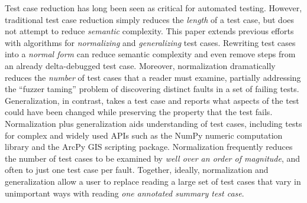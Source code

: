 Test case reduction has long been seen as critical for automated testing.  However, traditional test case reduction simply reduces the \emph{length} of a test case, but does not attempt to reduce \emph{semantic} complexity.  This paper extends previous efforts with algorithms for \emph{normalizing} and \emph{generalizing} test cases.  Rewriting test cases into a \emph{normal form} can reduce semantic complexity and even remove steps from an already delta-debugged test case.  Moreover, normalization dramatically reduces the \emph{number} of test cases that a reader must examine, partially addressing the ``fuzzer taming'' problem of discovering distinct faults in a set of failing tests.  Generalization, in contrast, takes a test case and reports what aspects of the test could have been changed while preserving the property that the test fails.  Normalization plus generalization aids understanding of test cases, including tests for complex and widely used APIs such as the NumPy numeric computation library and the ArcPy GIS scripting package.  Normalization frequently reduces the number of test cases to be examined by \emph{well over an order of magnitude}, and often to just one test case per fault.  Together, ideally, normalization and generalization allow a user to replace reading a large set of test cases that vary in unimportant ways with reading \emph{one annotated summary test case}.